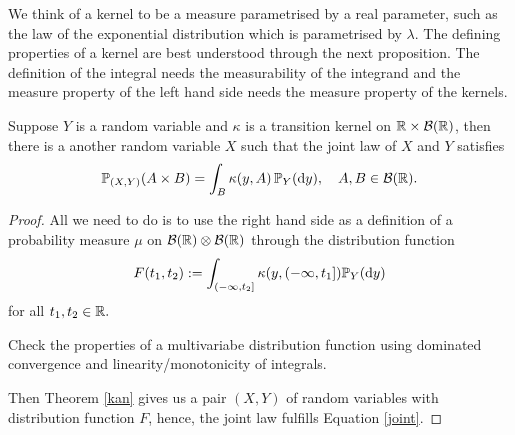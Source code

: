 We think of a kernel to be a measure parametrised by a real parameter, such as the law of the exponential distribution which is parametrised by $\lambda$. The defining properties of a kernel are best understood through the next proposition. The definition of the integral needs the measurability of the integrand and the measure property of the left hand side needs the measure property of the kernels.
\begin{llemma}
\begin{prop}
	Suppose $Y$ is a random variable and $\kappa$ is a transition kernel on $\R\times \mathcal B(\R)$, then there is a another random variable $X$ such that the joint law of $X$ and $Y$ satisfies
	\begin{align}\label{joint}
		\P_{(X,Y)}(A\times B)=\int_B \kappa(y,A) \,\P_Y(\mathrm d y),\quad A,B\in\mathcal B(\R).
	\end{align}
\end{prop}
\end{llemma}
\begin{proof}[Proof]
	All we need to do is to use the right hand side as a definition of a probability measure $\mu$ on $\mathcal B(\R)\otimes \mathcal B(\R)$ through the distribution function
	\begin{align*}
		F(t_1,t_2):= \int_{(-\infty,t_2]} \kappa(y,(-\infty,t_1]) \P_Y(\mathrm dy)
	\end{align*}	
	for all $t_1,t_2\in\R.$
	\begin{luebung}
		Check the properties of a multivariabe distribution function using dominated convergence and linearity/monotonicity of integrals.		
	\end{luebung}
	 Then Theorem \ref{kan} gives us a pair $(X,Y)$ of random variables with distribution function $F$, hence, the joint law fulfills Equation \eqref{joint}.
\end{proof}

